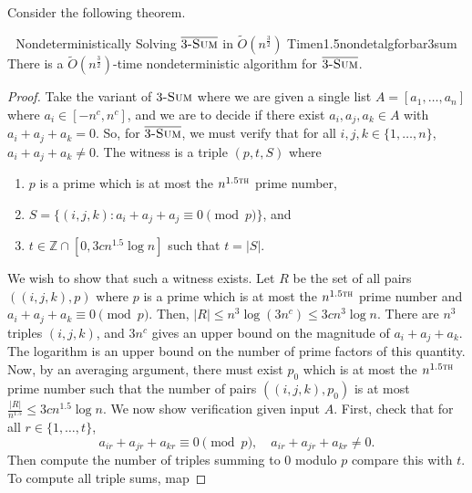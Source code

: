         \pagebreak
        \vphantom
        \\
        \\
        Consider the following theorem.
        \begin{theorem}{\Stop\,\,\cite{carmosino2016nseth} Nondeterministically Solving \(\bar{3\textsc{-Sum}}\) in \(\tilde{O}(n^{\frac{3}{2}})\) Time}{n1.5nondetalgforbar3sum}
            There is a \(\tilde{O}\left(n^{\frac{3}{2}}\right)\)-time nondeterministic algorithm for \(\bar{3\textsc{-Sum}}\).
            \begin{proof}
                Take the variant of \(3\textsc{-Sum}\) where we are given a single list \(A=[a_1,\ldots,a_n]\) where \(a_i\in[-n^c,n^c]\), and we are to decide if there exist \(a_i,a_j,a_k\in A\) with \(a_i+a_j+a_k=0\). So, for \(\bar{3\textsc{-Sum}}\), we must verify that for all \(i,j,k\in\{1,\ldots,n\}\), \(a_i+a_j+a_k\neq0\). The witness is a triple \((p,t,S)\) where 
                \begin{enumerate}
                    \item \(p\) is a prime which is at most the \(n^{1.5\textsc{th}}\) prime number,
                    \item \(S=\{(i,j,k):a_i+a_j+a_j\equiv0\pmod{p}\}\), and
                    \item \(t\in\mathbb{Z}\cap[0,3cn^{1.5}\log n]\) such that \(t=|S|\).
                \end{enumerate}
                We wish to show that such a witness exists. Let \(R\) be the set of all pairs \(((i,j,k),p)\) where \(p\) is a prime which is at most the \(n^{1.5\textsc{th}}\) prime number and \(a_i+a_j+a_k\equiv0\pmod{p}\). Then, \(|R|\leq n^3\log(3n^c)\leq 3cn^3\log n\). There are \(n^3\) triples \((i,j,k)\), and \(3n^c\) gives an upper bound on the magnitude of \(a_i+a_j+a_k\). The logarithm is an upper bound on the number of prime factors of this quantity. Now, by an averaging argument, there must exist \(p_0\) which is at most the \(n^{1.5\textsc{th}}\) prime number such that the number of pairs \(((i,j,k),p_0)\) is at most \(\frac{|R|}{n^{1.5}}\leq 3cn^{1.5}\log n\). We now show verification given input \(A\). First, check that for all \(r\in\{1,\ldots,t\}\),
                \begin{equation*}
                    a_{ir}+a_{jr}+a_{kr}\equiv0\pmod{p},\quad a_{ir}+a_{jr}+a_{kr}\neq0.
                \end{equation*}
                Then compute the number of triples summing to \(0\) modulo \(p\) compare this with \(t\). To compute all triple sums, map

\end{proof}
\end{theorem}
